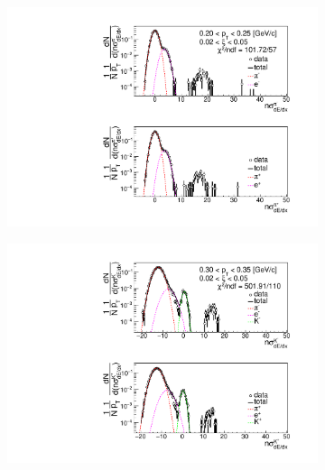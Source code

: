 \begin{figure}[h!]
	\centering
	\begin{subfigure}{.49\textwidth}
		\includegraphics[width=\linewidth, page=9]{chapters/chrgSTAR/img/dEdx/fit2019_secondStep_0_0.pdf}
	\end{subfigure}
	\begin{subfigure}{.49\textwidth}
		\includegraphics[width=\linewidth, page=7]{chapters/chrgSTAR/img/dEdx/fit2019_thirdStep_1_0.pdf}
	\end{subfigure}\par
	\begin{subfigure}{.49\textwidth}

\end{subfigure}
\end{figure}
